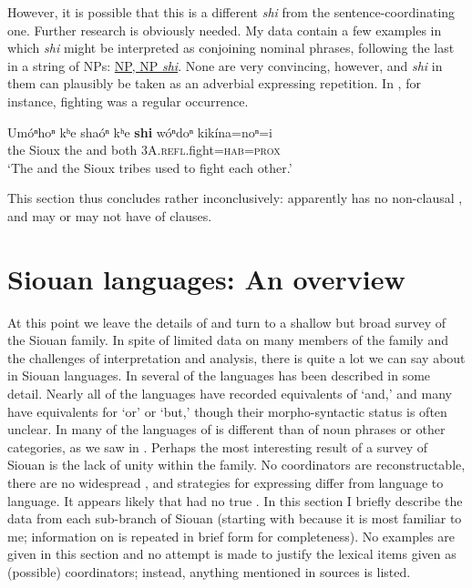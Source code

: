 \documentclass[output=paper]{LSP/langsci}
\begin{document}
However, it is possible that this is a different \textit{shi} from the sentence-coor\-di\-na\-ting one. Further research is obviously needed. My data contain a few examples in which \textit{shi} might be interpreted as conjoining nominal phrases, following the last in a string of NPs:  \uline{NP, NP \textit{shi}}. None are very convincing, however, and \textit{shi} in them can plausibly be taken as an adverbial expressing repetition. In , for instance, fighting was a regular occurrence.

\begin{exe}
\ex\label{ex:rudin:35}
\gll Umóⁿhoⁿ kʰe shaóⁿ kʰe \textbf{shi}  wóⁿdoⁿ 	kikína=noⁿ=i \\
    	the 	Sioux  	the 	and both \textsc{3A}.\textsc{refl}.fight=\textsc{hab}=\textsc{prox} \\
\trans `The  and the Sioux tribes used to fight each other.'    
\end{exe}

This section thus concludes rather inconclusively:  apparently has no non-clausal , and may or may not have  of clauses. 

\section{Siouan languages: An overview}\label{sec:rudin:4}

At this point we leave the details of  and turn to a shallow but broad survey of the Siouan family. In spite of limited data on many members of the family and the challenges of interpretation and analysis, there is quite a lot we can say about  in Siouan languages. In several of the languages  has been described in some detail. Nearly all of the languages have recorded equivalents of `and,' and many have equivalents for `or' or `but,' though their morpho-syntactic status is often unclear. In many of the languages  of  is different than  of noun phrases or other categories, as we saw in . Perhaps the most interesting result of a survey of Siouan  is the lack of unity within the family. No coordinators are reconstructable, there are no widespread , and strategies for expressing  differ from language to language. It appears likely that  had no true . In this section I briefly describe the data from each sub-branch of Siouan (starting with  because it is most familiar to me; information on  is repeated in brief form for completeness). No examples are given in this section and no attempt is made to justify the lexical items given as (possible) coordinators; instead, anything mentioned in sources is listed.
\end{document}
